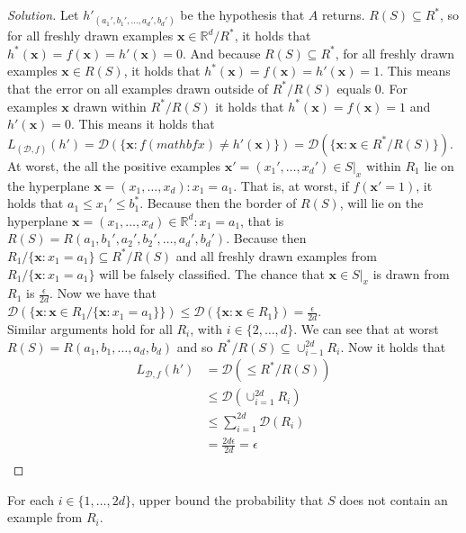 \documentclass[10pt, a4paper, twoside]{amsart}
\newcommand{\R}{\ensuremath{\mathbb{R}}}
\newenvironment{solution}
               {\let\oldqedsymbol=\qedsymbol
                \renewcommand{\qedsymbol}{$\blacktriangleleft$}
                \begin{proof}[Solution]}
               {\end{proof}
                \renewcommand{\qedsymbol}{\oldqedsymbol}}
\begin{document}
\begin{solution}
    Let $h'_{(a_1',b_1',\ldots,a_d',b_d')}$ be the hypothesis that $A$ returns. $R(S)\subseteq R^*$, so for all freshly drawn examples $\mathbf{x} \in \R^d/R^*$,  it holds that $h^*(\mathbf{x})=f(\mathbf{x}) = h'(\mathbf{x}) = 0$. And because $R(S)\subseteq R^*$, for all freshly drawn examples $\mathbf{x} \in R(S)$, it holds that $h^*(\mathbf{x})=f(\mathbf{x}) = h'(\mathbf{x}) = 1$. This means that the error on all examples drawn outside of $R^*/R(S)$ equals $0$. For examples $\mathbf{x}$ drawn within $R^*/R(S)$ it holds that $h^*(\mathbf{x})=f(\mathbf{x}) = 1$ and $h'(\mathbf{x}) = 0$. This means it holds that $L_{(\mathcal{D},f)}(h') = \mathcal{D}(\{\mathbf{x}: f(mathbf{x}) \neq h'(\mathbf{x})\}) = \mathcal{D}(\{\mathbf{x}:\mathbf{x}\in R^*/R(S)\})$. \\
  At worst, the all the positive examples $\mathbf{x'} = (x_1',\ldots,x_d') \in S|_x$ within $R_1$ lie on the hyperplane $\mathbf{x}=(x_1,\ldots,x_d):x_1 = a_1$. That is, at worst, if $f(\mathbf{x'} = 1)$, it holds that $a_1\leq x_1' \leq b_1^*$. Because then the border of $R(S)$, will lie on the hyperplane $\mathbf{x} = (x_1,\ldots,x_d) \in \R^d: x_1 = a_1$, that is $R(S) = R(a_1,b_1',a_2',b_2',\ldots, a_d',b_d')$. Because then $R_{1}/\{\mathbf{x}:x_1=a_1\} \subseteq R^*/R(S)$ and all freshly drawn examples from $R_{1}/\{\mathbf{x}:x_1=a_1\}$ will be falsely classified. The chance that $\mathbf{x} \in S|_x$ is drawn from $R_1$ is $\frac{\epsilon}{2d}$. Now we have that $\mathcal{D}(\{\mathbf{x}: \mathbf{x} \in R_{1}/\{\mathbf{x}:x_1=a_1\}\}) \leq \mathcal{D}(\{\mathbf{x}: \mathbf{x} \in R_{1}\}) = \frac{\epsilon}{2d}$.\\
  Similar arguments hold for all $R_i$, with $i \in \{2, \ldots ,d\}$. We can see that at worst $R(S) = R(a_1,b_1,\ldots,a_d,b_d)$ and so $R^*/R(S) \subseteq \cup_{i-1}^{2d} R_i$. Now it holds that
\begin{align*}
  L_{\mathcal{D},f}(h') & = \mathcal{D}(\leq R^*/R(S)) \\
                      & \leq \mathcal{D}(\cup_{i=1}^{2d} R_i) \\
                      & \leq \sum_{i=1}^{2d} \mathcal{D}(R_i)\\
 & = \frac{2d\epsilon}{2d} = \epsilon \\
\end{align*}
\end{solution}
For each $i \in \{1,\ldots,2d\}$, upper bound the probability that $S$ does not contain an example from $R_i$.\\
\end{document}
